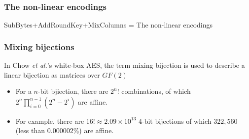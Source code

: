 \documentclass{beamer}
\begin{document}
\frame
{
\frametitle{The non-linear encodings}
SubBytes+AddRoundKey+MixColumns = The non-linear encodings

\begin{figure}[h]
\setcounter{subfigure}{0}
\centering
{}
\end{figure}
}

\frame
{
\frametitle{Mixing bijections}
In Chow \textit{et al.}'s white-box AES, the term \textcolor[rgb]{1.00,0.00,0.00}{mixing bijection} is used to describe a linear bijection as matrices over $GF(2)$

\begin{itemize}
\item For a $n$-bit bjiection, there are $2^{n}!$ combinations, of which $2^{n}\prod^{n-1}_{i=0}(2^{n}-2^{i})$ are affine.

\item For example, there are $16! \approx 2.09 \times 10^{13}$ 4-bit bijections of which $322,560$ (less than $0.000002\%$) are affine.
\end{itemize}
}
\end{document}

